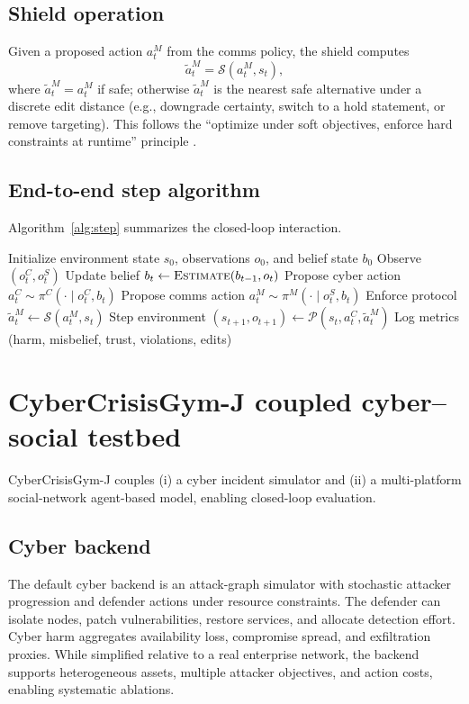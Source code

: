 \documentclass[biomimetics,article,submit,pdftex,moreauthors]{Definitions/mdpi}
\newcommand{\model}{V-CHIMERA}
\newcommand{\envname}{CyberCrisisGym-J}
\begin{document}
\subsection{Shield operation}
Given a proposed action $a^M_t$ from the comms policy, the shield computes
\begin{equation}
\tilde a^M_t = \mathcal{S}(a^M_t, s_t),
\end{equation}
where $\tilde a^M_t = a^M_t$ if safe; otherwise $\tilde a^M_t$ is the nearest safe alternative under a discrete edit distance (e.g., downgrade certainty, switch to a hold statement, or remove targeting). This follows the ``optimize under soft objectives, enforce hard constraints at runtime'' principle \citep{alshiekh2018safe,koenighofer2024shields}.

\subsection{End-to-end step algorithm}
Algorithm~\ref{alg:step} summarizes the closed-loop interaction.

\begin{algorithm}[t]
\caption{\model{} closed-loop step (single episode)}
\label{alg:step}
\begin{algorithmic}[1]
\State Initialize environment state $s_0$, observations $o_0$, and belief state $b_0$
  \State Observe $(o^C_t, o^S_t)$
  \State Update belief $b_t \leftarrow \textsc{Estimate}(b_{t-1}, o_t)$
  \State Propose cyber action $a^C_t \sim \pi^C(\cdot \mid o^C_t, b_t)$
  \State Propose comms action $a^M_t \sim \pi^M(\cdot \mid o^S_t, b_t)$
  \State Enforce protocol $\tilde a^M_t \leftarrow \mathcal{S}(a^M_t, s_t)$
  \State Step environment $(s_{t+1}, o_{t+1}) \leftarrow \mathcal{P}(s_t, a^C_t, \tilde a^M_t)$
  \State Log metrics (harm, misbelief, trust, violations, edits)
\EndFor
\end{algorithmic}
\end{algorithm}

\section{\envname{} coupled cyber--social testbed}
\envname{} couples (i) a cyber incident simulator and (ii) a multi-platform social-network agent-based model, enabling closed-loop evaluation.

\subsection{Cyber backend}
The default cyber backend is an attack-graph simulator with stochastic attacker progression and defender actions under resource constraints. The defender can isolate nodes, patch vulnerabilities, restore services, and allocate detection effort. Cyber harm aggregates availability loss, compromise spread, and exfiltration proxies. While simplified relative to a real enterprise network, the backend supports heterogeneous assets, multiple attacker objectives, and action costs, enabling systematic ablations.
\end{document}
